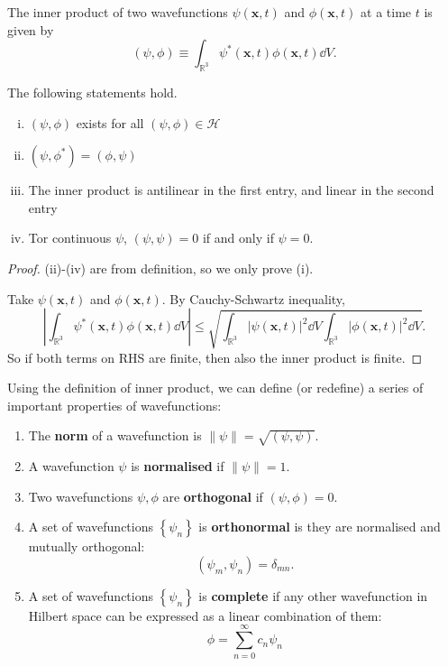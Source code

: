 \documentclass[a4paper,11pt]{article}
\begin{document}
\begin{definition}
    The inner product of two wavefunctions $\psi(\mathbf{x}, t)$ and $\phi(\mathbf{x}, t)$ at a time $t$ is given by
    \[
    (\psi, \phi) \equiv \int_{\mathbb{R}^3} \psi^*(\mathbf{x}, t) \phi(\mathbf{x}, t) \dd V .
    \]
\end{definition}

\begin{theorem}
    The following statements hold.
\begin{enumerate}[(i)]
	\item \( (\psi, \phi) \) exists for all \( (\psi, \phi) \in \mathcal H \)
	\item \( (\psi, \phi^*) = (\phi, \psi) \)
	\item The inner product is antilinear in the first entry, and linear in the second entry
	\item Tor continuous \( \psi \), \( (\psi, \psi) = 0 \) if and only if \( \psi=0 \).
\end{enumerate}
\end{theorem}
\begin{proof}
    (ii)-(iv) are from definition, so we only prove (i). 

    Take $\psi(\mathbf{x}, t)$ and $\phi(\mathbf{x}, t)$. By Cauchy-Schwartz inequality,
    \[
    \left|\int_{\mathbb{R}^3} \psi^*(\mathbf{x}, t) \phi(\mathbf{x}, t) \dd V\right| \leq \sqrt{\int_{\mathbb{R}^3}|\psi(\mathbf{x}, t)|^2 \dd V \int_{\mathbb{R}^3}|\phi(\mathbf{x}, t)|^2 \dd V} .
    \]
    So if both terms on RHS are finite, then also the inner product is finite.
\end{proof}

Using the definition of inner product, we can define (or redefine) a series of important properties of wavefunctions:

\begin{definition}
    \begin{enumerate}
        \item The \textbf{norm} of a wavefunction is $\|\psi\|=\sqrt{(\psi, \psi)}$.
        \item A wavefunction $\psi$ is \textbf{normalised} if $\|\psi\|=1$.
        \item Two wavefunctions $\psi, \phi$ are \textbf{orthogonal} if $(\psi, \phi)=0$.
        \item A set of wavefunctions $\left\{\psi_n\right\}$ is \textbf{orthonormal} is they are normalised and mutually orthogonal:
        \[
        \left(\psi_m, \psi_n\right)=\delta_{m n} .
        \]
        \item A set of wavefunctions $\left\{\psi_n\right\}$ is \textbf{complete} if any other wavefunction in Hilbert space can be expressed as a linear combination of them:
        \[
        \phi=\sum_{n=0}^{\infty} c_n \psi_n
        \]
    \end{enumerate}
\end{definition}
\end{document}
